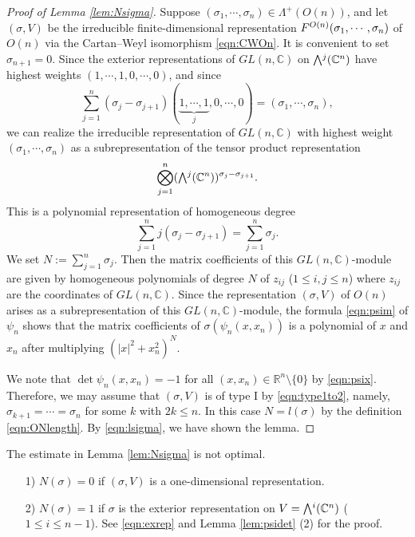 \begin{proof}
[Proof of Lemma \ref{lem:Nsigma}]
Suppose 
$(\sigma_1, \cdots, \sigma_n) \in \Lambda^+(O(n))$, 
 and let $(\sigma,V)$ be the irreducible finite-dimensional 
 representation $F^{{O(n)}}({\sigma_1, \cdots, \sigma_n})$
 of $O(n)$
 via the Cartan--Weyl isomorphism
 \eqref{eqn:CWOn}.  
It is convenient to set $\sigma_{n+1}=0$.  
Since the exterior representations
 of $GL(n,{\mathbb{C}})$ on $\Exterior^j({\mathbb{C}}^n)$
 have 
 highest weights $(1,\cdots,1,0,\cdots,0)$, 
 and since
\[
   \sum_{j=1}^{n}(\sigma_j-\sigma_{j+1})
   (\underbrace{1,\cdots,1}_j,0,\cdots,0)
  =(\sigma_1,\cdots,\sigma_n), 
\]
we can realize the irreducible representation of $GL(n,{\mathbb{C}})$
 with highest weight $(\sigma_1,\cdots,\sigma_n)$
 as a subrepresentation
 of the tensor product representation
\[
  \bigotimes_{j=1}^{n} (\Exterior^j({\mathbb{C}}^n))^{\sigma_j-\sigma_{j+1}}.  
\]
This is a polynomial representation of homogeneous degree
\[
   \sum_{j=1}^n j (\sigma_j-\sigma_{j+1})=\sum_{j=1}^n \sigma_j.  
\]
We set $N:=\sum_{j=1}^n \sigma_j$.  
Then the matrix coefficients of this $GL(n,{\mathbb{C}})$-module
 are given by homogeneous polynomials
 of degree $N$
 of $z_{ij}$
 ($1 \le i,j \le n$)
 where $z_{ij}$ are the coordinates
 of $GL(n,{\mathbb{C}})$.  
Since the representation $(\sigma, V)$ of $O(n)$
 arises as a subrepresentation
 of this $GL(n,{\mathbb{C}})$-module, 
 the formula \eqref{eqn:psim}
 of $\psi_n$ shows that the matrix coefficients of $\sigma(\psi_n(x,x_n))$
 is a polynomial of $x$ and $x_n$ 
 after multiplying $(|x|^2 + x_n^2)^N$.  



We note
 that $\det \psi_n(x,x_n)=-1$
 for all $(x,x_n) \in {\mathbb{R}}^n \setminus \{0\}$
 by \eqref{eqn:psix}.  
Therefore, 
 we may assume
 that $(\sigma,V)$ is of 
type I
 by \eqref{eqn:type1to2}, 
 namely, 
 $\sigma_{k+1}=\cdots=\sigma_n$
 for some $k$
 with $2k \le n$.  
In this case $N=l(\sigma)$
 by the definition \eqref{eqn:ONlength}.  
By \eqref{eqn:lsigma}, 
 we have shown the lemma.  
\end{proof}


The estimate in Lemma \ref{lem:Nsigma} is not optimal.  



\begin{example}
\label{ex:Nsigma}
\begin{enumerate}
\item[{\rm{1)}}]
$N(\sigma)=0$ if $(\sigma, V)$ is a one-dimensional representation.  
\item[{\rm{2)}}]
$N(\sigma)=1$ if $\sigma$ is the exterior representation
 on $V= \Exterior^i({\mathbb{C}}^n)$
 ($1 \le i \le n-1$).  
See \eqref{eqn:exrep}
 and Lemma \ref{lem:psidet} (2)
 for the proof.  
\end{enumerate}
\end{example}



